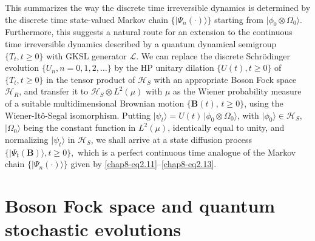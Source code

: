 This summarizes the way the discrete time irreversible dynamics  is determined by the discrete time state-valued Markov chain $\{\vert\Psi_n(\cdot)\rangle\}$ starting from $\vert\phi_0 \otimes \Omega_0\rangle$.  Furthermore, this suggests a natural route for an extension to the continuous time irreversible dynamics described by a quantum dynamical semigroup $\{T_t, t\geq 0\}$ with GKSL generator $\mathcal{L}$. We can replace the discrete Schr{\"o}dinger evolution $\{U_n, n=0,1,2,\ldots\}$ by the HP unitary dilation $\{U(t), t\geq 0\}$ of $\{T_t, t\geq 0\}$ in the tensor product of $\mathcal{H}_S$ with an appropriate Boson Fock space $\mathcal{H}_R$, and transfer it to $\mathcal{H}_S\otimes L^2(\mu)$ with $\mu$ as the Wiener probability measure of a suitable multidimensional Brownian motion $\{\mathbf{B}(t),\, t\geq 0\}$, using the Wiener-It{\^o}-Segal isomorphism. Putting $\vert\psi_t\rangle=U(t)\, \vert \phi_0\otimes \Omega_0\rangle$, with $\vert\phi_0\rangle\in \mathcal{H}_S$, $\vert\Omega_0\rangle$ being the constant function in $L^2(\mu)$, identically equal to unity, and  normalizing $\vert\psi_t\rangle$ in $\mathcal{H}_S$, we shall arrive at a state diffusion process $\{\vert \Psi_t(\mathbf{B})\rangle, t\geq 0\},$ which is a perfect continuous time analogue of the Markov chain $\{\vert \Psi_n(\cdot )\rangle\}$ given by \eqref{chap8-eq2.11}--\eqref{chap8-eq2.13}.

\section{Boson Fock space and quantum stochastic evolutions}\label{chap8-sec3}

